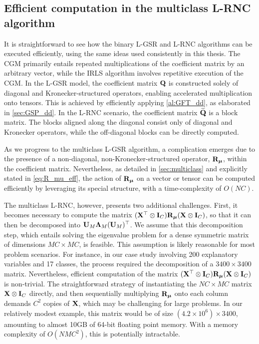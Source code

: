 \subsection{Efficient computation in the multiclass L-RNC algorithm}

It is straightforward to see how the binary L-GSR and L-RNC algorithms can be executed efficiently, using the same ideas used consistently in this thesis. The CGM primarily entails repeated multiplications of the coefficient matrix by an arbitrary vector, while the IRLS algorithm involves repetitive execution of the CGM. In the L-GSR model, the coefficient matrix $\mathbf{Q}$ is constructed solely of diagonal and Kronecker-structured operators, enabling accelerated multiplication onto tensors. This is achieved by efficiently applying \cref{al:GFT_dd}, as elaborated in \cref{sec:GSP_dd}. In the L-RNC scenario, the coefficient matrix $\widetilde{\mathbf{Q}}$ is a block matrix. The blocks aligned along the diagonal consist only of diagonal and Kronecker operators, while the off-diagonal blocks can be directly computed.

As we progress to the multiclass L-GSR algorithm, a complication emerges due to the presence of a non-diagonal, non-Kronecker-structured operator, $\mathbf{R}_{\boldsymbol{\mu}}$, within the coefficient matrix. Nevertheless, as detailed in \cref{sec:multiclass} and explicitly stated in \cref{eq:R_mu_eff}, the action of $\mathbf{R}_{\boldsymbol{\mu}}$ on a vector or tensor can be computed efficiently by leveraging its special structure, with a time-complexity of $O(NC)$. 

The multiclass L-RNC, however, presents two additional challenges. First, it becomes necessary to compute the matrix $(\mathbf{X}^\top \otimes \mathbf{I}_C) \mathbf{R}_{\boldsymbol{\mu}} (\mathbf{X} \otimes \mathbf{I}_C)$, so that it can then be decomposed into $\mathbf{U}_M \mathbf{\Lambda}_M (\mathbf{U}_M )^\top$. We assume that this decomposition step, which entails solving the eigenvalue problem for a dense symmetric matrix of dimensions $MC \times MC$, is feasible. This assumption is likely reasonable for most problem scenarios. For instance, in our case study involving 200 explanatory variables and 17 classes, the process required the decomposition of a $3400 \times 3400$ matrix. Nevertheless, efficient computation of the matrix $(\mathbf{X}^\top \otimes \mathbf{I}_C) \mathbf{R}_{\boldsymbol{\mu}} (\mathbf{X} \otimes \mathbf{I}_C)$ is non-trivial. The straightforward strategy of instantiating the $NC \times MC$ matrix $\mathbf{X} \otimes \mathbf{I}_C$ directly, and then sequentially multiplying $\mathbf{R}_{\boldsymbol{\mu}}$ onto each column demands $C^2$ copies of $\mathbf{X}$, which may be challenging for large problems. In our relatively modest example, this matrix would be of size $(4.2 \times 10^6) \times 3400$, amounting to almost 10GB of 64-bit floating point memory. With a memory complexity of $O(NMC^2)$, this is potentially intractable. 

